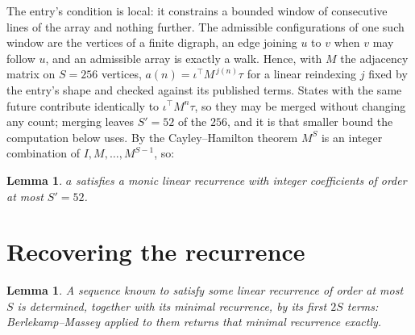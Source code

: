 \documentclass[11pt,a4paper]{article}
\theoremstyle{plain}
\newtheorem{lemma}[theorem]{Lemma}
\theoremstyle{definition}
\begin{document}
The entry's condition is local: it constrains a bounded window of consecutive lines of the
array and nothing further. The admissible configurations of one such window are the vertices
of a finite digraph, an edge joining $u$ to $v$ when $v$ may follow $u$, and an admissible
array is exactly a walk. Hence, with $M$ the adjacency matrix on $S=256$ vertices,
$a(n)=\iota^{\!\top}M^{\,j(n)}\tau$ for a linear reindexing $j$ fixed by the entry's shape
and checked against its published terms. States with the same future contribute identically to $\iota^{\!\top}M^n\tau$, so they may be merged without changing any count; merging leaves $S'=52$ of the $256$, and it is that smaller bound the computation below uses. By the Cayley--Hamilton theorem $M^{S}$ is an
integer combination of $I,M,\dots,M^{S-1}$, so:

\begin{lemma}\label{lem:cf}
$a$ satisfies a monic linear recurrence with integer coefficients of order at most
$S'=52$.
\end{lemma}

\section{Recovering the recurrence}

\begin{lemma}\label{lem:bm}
A sequence known to satisfy some linear recurrence of order at most $S$ is determined, together
with its minimal recurrence, by its first $2S$ terms: Berlekamp--Massey applied to them returns
that minimal recurrence exactly.
\end{lemma}
\end{document}
